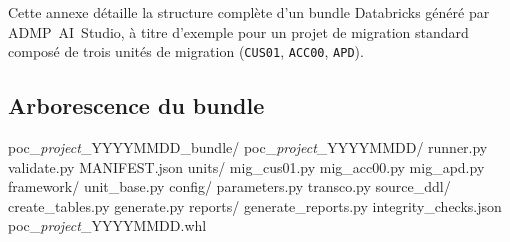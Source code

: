 

Cette annexe détaille la structure complète d'un bundle Databricks généré par ADMP~AI~Studio, à titre d'exemple pour un projet de migration standard composé de trois unités de migration (\texttt{CUS01}, \texttt{ACC00}, \texttt{APD}).

\subsection*{Arborescence du bundle}

\begin{tcolorbox}[colback=accenturegray!40, colframe=accenturedark, boxrule=0.5pt, arc=3pt,
  left=8pt, right=8pt, top=5pt, bottom=5pt, fontupper=\small\ttfamily]
poc\_\textit{project}\_YYYYMMDD\_bundle/\newline
\quad poc\_\textit{project}\_YYYYMMDD/\newline
\quad\quad runner.py\newline
\quad\quad validate.py\newline
\quad\quad MANIFEST.json\newline
\quad\quad units/\newline
\quad\quad\quad mig\_cus01.py\newline
\quad\quad\quad mig\_acc00.py\newline
\quad\quad\quad mig\_apd.py\newline
\quad\quad framework/\newline
\quad\quad\quad unit\_base.py\newline
\quad\quad config/\newline
\quad\quad\quad parameters.py\newline
\quad\quad\quad transco.py\newline
\quad\quad source\_ddl/\newline
\quad\quad\quad create\_tables.py\newline
\quad\quad\quad generate.py\newline
\quad\quad reports/\newline
\quad\quad\quad generate\_reports.py\newline
\quad\quad\quad integrity\_checks.json\newline
poc\_\textit{project}\_YYYYMMDD.whl
\end{tcolorbox}


